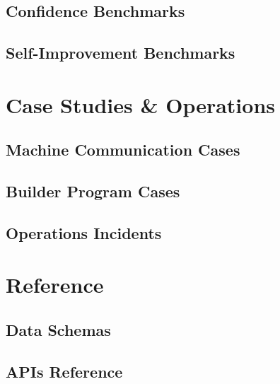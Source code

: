 \documentclass[11pt,a4paper,twoside]{book}
\theoremstyle{definition}
\theoremstyle{remark}
\begin{document}
\chapter{Confidence Benchmarks}
\label{ch:confidence_benchmarks}


\chapter{Self-Improvement Benchmarks}
\label{ch:self_improvement_benchmarks}


\part{Case Studies \& Operations}

\chapter{Machine Communication Cases}
\label{ch:machine_communication}


\chapter{Builder Program Cases}
\label{ch:builder_program}


\chapter{Operations Incidents}
\label{ch:operations_incidents}


\part{Reference}

\chapter{Data Schemas}
\label{ch:data_schemas}


\chapter{APIs Reference}
\label{ch:apis_reference}

\end{document}
